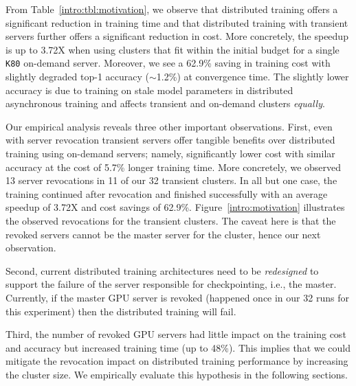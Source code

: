 From Table~\ref{intro:tbl:motivation}, we observe that distributed training
offers a significant reduction in training time and that distributed training
with transient servers further offers a significant reduction in cost. More
concretely, the speedup is up to 3.72X when using clusters that fit within the
initial budget for a single \texttt{K80} on-demand server.  Moreover, we see a 62.9\%
saving in training cost with slightly degraded top-1 accuracy ($\sim$1.2\%) at
convergence time. The slightly lower accuracy is due to training on stale model
parameters in distributed asynchronous training and affects transient and
on-demand clusters \emph{equally}. 

Our empirical analysis reveals three other important observations.  First, even
with server revocation transient servers offer tangible benefits over distributed training using on-demand
servers; namely, significantly lower cost with similar accuracy at the cost of 5.7\%
longer training time. More concretely, we observed 13 server revocations in 11 of our 32
transient clusters. In all but one case, the training continued after
revocation and finished successfully with an average speedup of 3.72X and cost
savings of 62.9\%. 
Figure~\ref{intro:motivation} illustrates the observed
revocations for the transient clusters. The caveat here is that the revoked
servers cannot be the master server for the cluster, hence our next
observation. 

Second, current distributed training architectures need to be \emph{redesigned} to
support the failure of the server responsible for checkpointing, i.e., the
master. Currently, if the master GPU server is revoked (happened once in our 32
runs for this experiment) then the distributed training will fail. 

Third, the number of revoked GPU servers had little impact on the training cost
and accuracy but increased training time (up to 48\%). This implies that we
could mitigate the revocation impact on distributed training performance by
increasing the cluster size. We empirically evaluate this hypothesis in
the following sections.

